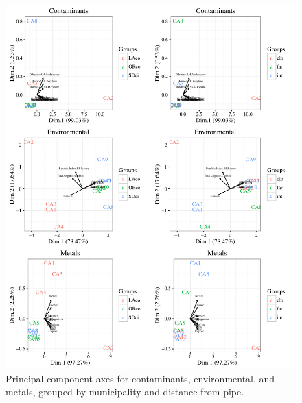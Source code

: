 \documentclass[letterpaper,12pt]{article}\usepackage[]{graphicx}\usepackage[]{color}
\newenvironment{knitrout}{}{} %
\begin{document}
\begin{knitrout}
\color{fgcolor}\begin{figure}[!ht]

{\centering \includegraphics[width=\textwidth]{figs/unnamed-chunk-5-1} 

}

\caption[Principal component axes for contaminants, environmental, and metals, grouped by municipality and distance from pipe]{Principal component axes for contaminants, environmental, and metals, grouped by municipality and distance from pipe.}\label{fig:unnamed-chunk-5}
\end{figure}


\end{knitrout}
\end{document}
